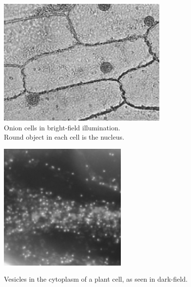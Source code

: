\documentclass{../lab}
\begin{document}
\begin{figure}
\captionsetup{justification=centering}
\begin{minipage}[t]{.5\linewidth}
    \centering
    \href{http://experimentationlab.berkeley.edu/sites/default/files/images/250px-Image005.png}{\includegraphics[height=180pt,keepaspectratio]{images/250px-Image005.png}} \\
    \caption{Onion cells in bright-field illumination. \\ Round object in each cell is the nucleus.}
\end{minipage}\hfill
\begin{minipage}[t]{.39\linewidth}
    \centering
    \href{http://experimentationlab.berkeley.edu/sites/default/files/images/Image003.png}{\includegraphics[height=180pt,keepaspectratio]{images/Image003.png}} \\
    \caption{Vesicles in the cytoplasm of a plant cell, as seen in dark-field.}
\end{minipage} 
\end{figure}
\end{document}
